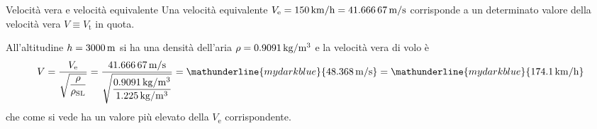 %

%
\begin{myExampleX}{Velocità vera e velocità equivalente}{}%
\label{example:Equivalent:Airspeed:Basic:A}
%
\noindent
Una velocità equivalente 
$V_\mathrm{e}
 =\SI[round-precision=0]{\myFlightSpeedEASKMH}{km/h}
 =\SI[round-precision=1]{\myFlightSpeedEASMTSec}{m/s}$
corrisponde a un determinato valore della velocità vera $V\equiv V_\mathrm{t}$ in quota.

All'altitudine $h=\SI[round-precision=0]{\myAltitudeMT}{m}$ si ha
una densità dell'aria $\rho=\SI[round-precision=3]{\myAirDensityKGMTcubed}{kg/m^3}$
e la velocità vera di volo è
\[
V = 
  \frac{ V_\text{e} }{ \sqrt{\dfrac{\rho}{\rho_\mathrm{SL}}} }
  = 
  \frac{
    \SI[round-precision=1]{\myFlightSpeedEASMTSec}{m/s}
  }{
    \sqrt{
      \dfrac{
        \SI[round-precision=3]{\myAirDensityKGMTcubed}{kg/m^3}
      }{
        \SI[round-precision=3]{\myISAAirDensitySeaLevelKGMTcubed}{kg/m^3}
      }
    }
  }
= 
  \mathunderline{mydarkblue}{ \SI[round-precision=1]{\myFlightSpeedMTSec}{\meter/\second} }
  = \mathunderline{mydarkblue}{ \SI[round-precision=1]{\myFlightSpeedKMH}{\kilo\meter/\hour} }
\]
che come si vede ha un valore più elevato della $V_\mathrm{e}$ corrispondente.

\end{myExampleX}
%

